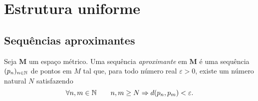 \begin{comment}
\begin{proposition}
Seja $\bm M$ um espaço métrico e $K,K' \subseteq M$ compactos disjuntos. Então $F$ e $F'$ são metricamente separados.
\end{proposition}
\begin{proof}
Sejam $F,F' \subseteq M$ fechados disjuntos. Mostraremos que $F$ e $F'$ são metricamente separados.
 Queremos mostrar que
	\begin{equation*}
	\dist{F}{F'} = \inf \set{\dist{f}{f'}}{f \in F, f' \in F'} > 0.
	\end{equation*}
Existem sequências $(f_n)_{n \in \N}$ em $F$ e $(f'_n)_{n \in \N}$ em $F'$ tais que
	\begin{equation*}
	\dist{F}{F'} = \lim_{n \conv \infty} \dist{f_n}{f'_n}.
	\end{equation*}
Mas como $F$ e $F'$ são fechados, existem $f \in F$ e $f' \in F'$ tais que $f = \lim_{n \conv \infty} f_n$ e $f' = \lim_{n \conv \infty} f'_n$. Da continuidade da distância,
	\begin{equation*}
	\dist{F}{F'} = \lim_{n \conv \infty} \dist{f_n}{f'_n} = \dist{f}{f'}.
	\end{equation*}
Como $F \cap F' = \emptyset$, então $f \neq f'$, portanto $\dist{f}{f'} > 0$, o que implica que
	\begin{equation*}
	\dist{F}{F'} = \dist{f}{f'} > 0.
	\end{equation*}
\end{proof}

\end{comment}








\section{Estrutura uniforme}

\subsection{Sequências aproximantes}

\begin{definition}
Seja $\bm M$ um espaço métrico. Uma sequência \emph{aproximante} em $\bm M$ é uma sequência $(p_n)_{n \in \mathbb{N}}$ de pontos em $M$ tal que, para todo número real $\varepsilon > 0$, existe um número natural $N$ satisfazendo
	\begin{equation*}
	\forall n,m \in \mathbb{N} \qquad n,m \geq N \Rightarrow d(p_n,p_m) < \varepsilon.
	\end{equation*}
\end{definition}


